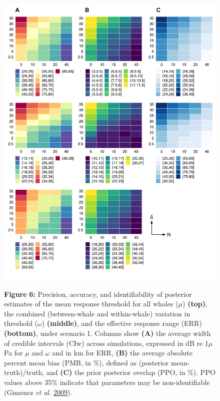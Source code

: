 \documentclass[
]{article}
\begin{document}
\begin{figure}

{\centering \includegraphics[width=0.9\linewidth]{fig/fig_heatplot_S1} 

}

\textbf{Figure }{\textbf{6:} \hypertarget{fig6}{}Precision, accuracy, and identifiability of posterior estimates of the mean response threshold for all whales (\(\mu\)) \textbf{(top)}, the combined (between-whale and within-whale) variation in threshold (\(\omega\)) \textbf{(middle)}, and the effective response range (ERR) \textbf{(bottom)}, under scenario 1. Columns show \textbf{(A)} the average width of credible intervals (CIw) across simulations, expressed in dB re 1\(\mu\)Pa for \(\mu\) and \(\omega\) and in km for ERR, \textbf{(B)} the average absolute percent mean bias (PMB, in \%), defined as (posterior mean-truth)/truth, and \textbf{(C)} the prior posterior overlap (PPO, in \%). PPO values above 35\% indicate that parameters may be non-identifiable (Gimenez \emph{et al.} \protect\hyperlink{ref-Gimenez2009}{2009}).}\label{fig:unnamed-chunk-5}
\end{figure}
\end{document}
